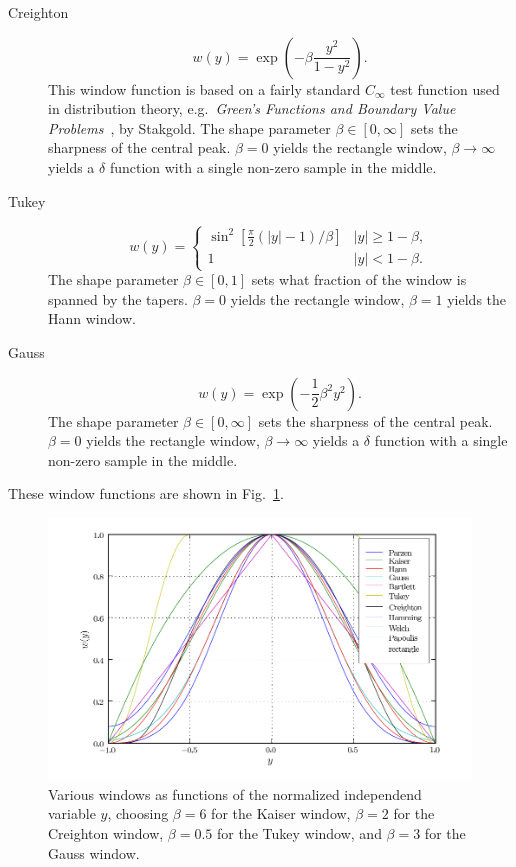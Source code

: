 \begin{description}
\item[Creighton]
\begin{equation}
w(y)
   = \exp \left( -\beta \frac{y^2}{1 - y^2} \right).
\end{equation}
This window function is based on a fairly standard $C_{\infty}$ test
function used in distribution theory, e.g.\ \textit{Green's Functions and
Boundary Value Problems}~\cite{stakgold}, by Stakgold.  The shape parameter
$\beta \in [0, \infty]$ sets the sharpness of the central peak.  $\beta =
0$ yields the rectangle window, $\beta \rightarrow \infty$ yields a
$\delta$ function with a single non-zero sample in the middle.

\item[Tukey]
\begin{equation}
w(y)
   = \left\{ \begin{array}{ll}
   \sin^2 \left[ \frac{\pi}{2} (|y| - 1) / \beta \right] & |y| \geq 1 -
   \beta,
   \\
   1 & |y| < 1 - \beta.
   \end{array} \right.
\end{equation}
The shape parameter $\beta \in [0, 1]$ sets what fraction of the window is
spanned by the tapers.  $\beta = 0$ yields the rectangle window, $\beta =
1$ yields the Hann window.

\item[Gauss]
\begin{equation}
w(y)
   = \exp \left( -\frac{1}{2} \beta^{2} y^{2} \right).
\end{equation}
The shape parameter $\beta \in [0, \infty]$ sets the sharpness of the
central peak.  $\beta = 0$ yields the rectangle window, $\beta \rightarrow
\infty$ yields a $\delta$ function with a single non-zero sample in the
middle.

\end{description}
These window functions are shown in Fig.~\ref{f:window-t}.
\begin{figure}
\begin{center}
\includegraphics{window_t}
\end{center}
\caption{\label{f:window-t} Various windows as functions of the normalized
independend variable $y$, choosing $\beta = 6$ for the Kaiser window,
$\beta = 2$ for the Creighton window, $\beta = 0.5$ for the Tukey window,
and $\beta = 3$ for the Gauss window.}
\end{figure}

